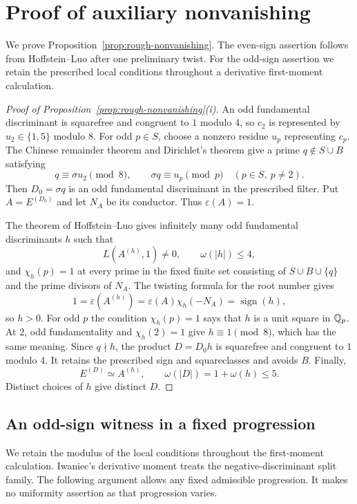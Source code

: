 \section{Proof of auxiliary nonvanishing}
\label{sec:auxiliary-nonvanishing}

We prove Proposition~\ref{prop:rough-nonvanishing}. The even-sign
assertion follows from Hoffstein--Luo after one preliminary twist.
For the odd-sign assertion we retain the prescribed local conditions
throughout a derivative first-moment calculation.

\begin{proof}[Proof of Proposition~\ref{prop:rough-nonvanishing}\textup{(i)}]
An odd fundamental discriminant is squarefree and congruent to $1$
modulo $4$, so $c_2$ is represented by $u_2\in\{1,5\}$ modulo $8$.
For odd $p\in S$, choose a nonzero residue $u_p$ representing $c_p$.
The Chinese remainder theorem and Dirichlet's theorem give a prime
$q\notin S\cup B$ satisfying
\[
 q\equiv\sigma u_2\pmod8,\qquad
 \sigma q\equiv u_p\pmod p\quad(p\in S,\ p\ne2).
\]
Then $D_0=\sigma q$ is an odd fundamental discriminant in the prescribed
filter. Put $A=E^{(D_0)}$ and let $N_A$ be its conductor. Thus
$\varepsilon(A)=1$.

The theorem of Hoffstein--Luo
\citep[pp.~435--436]{HoffsteinLuo1997} gives infinitely many odd
fundamental discriminants $h$ such that
\[
 L(A^{(h)},1)\ne0,\qquad \omega(|h|)\le4,
\]
and $\chi_h(p)=1$ at every prime in the fixed finite set consisting of
$S\cup B\cup\{q\}$ and the prime divisors of $N_A$.
The twisting formula for the root number gives
\[
 1=\varepsilon(A^{(h)})=\varepsilon(A)\chi_h(-N_A)
 =\operatorname{sign}(h),
\]
so $h>0$. For odd $p$ the condition $\chi_h(p)=1$ says that $h$ is a
unit square in $\mathbb Q_p$. At $2$, odd fundamentality and $\chi_h(2)=1$
give $h\equiv1\pmod8$, which has the same meaning.
Since $q\nmid h$, the product $D=D_0h$ is squarefree and congruent to
$1$ modulo $4$. It retains the prescribed sign and squareclasses and
avoids $B$. Finally,
\[
 E^{(D)}\simeq A^{(h)},\qquad \omega(|D|)=1+\omega(h)\le5.
\]
Distinct choices of $h$ give distinct $D$.
\end{proof}

\subsection{An odd-sign witness in a fixed progression}
\label{odd:fixed-progression}

We retain the modulus of the local conditions throughout the first-moment
calculation.  Iwaniec's derivative moment
\citep[Theorem on p.~367 and Sections~6--10]{Iwaniec1990} treats the
negative-discriminant split family.  The following argument allows any
fixed admissible progression.  It makes no uniformity assertion as that
progression varies.

